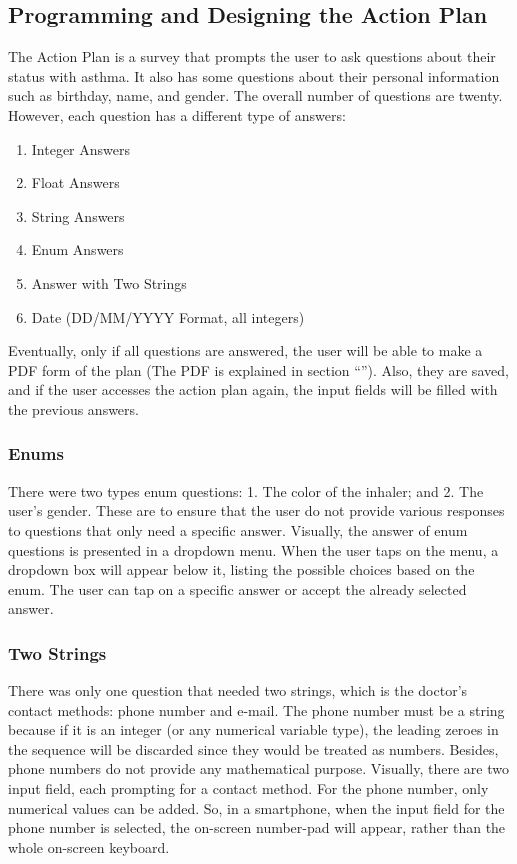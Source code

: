 \subsection{Programming and Designing the Action Plan}
The Action Plan is a survey that prompts the user to ask questions about their status with asthma. It also has some questions about their personal information such as birthday, name, and gender. The overall number of questions are twenty. However, each question has a different type of answers:
\begin{enumerate}
    \item{Integer Answers}
    
    \item{Float Answers}
    
    \item{String Answers}
    
    \item{Enum Answers}
    
    \item{Answer with Two Strings}
    
    \item{Date (DD/MM/YYYY Format, all integers)}
\end{enumerate}
Eventually, only if all questions are answered, the user will be able to make a PDF form of the plan (The PDF is explained in section “\textbf{}”). Also, they are saved, and if the user accesses the action plan again, the input fields will be filled with the previous answers.

\subsubsection*{Enums}
There were two types enum questions: 1. The color of the inhaler; and 2. The user’s gender. These are to ensure that the user do not provide various responses to questions that only need a specific answer. Visually, the answer of enum questions is presented in a dropdown menu. When the user taps on the menu, a dropdown box will appear below it, listing the possible choices based on the enum. The user can tap on a specific answer or accept the already selected answer.

\subsubsection*{Two Strings}
There was only one question that needed two strings, which is the doctor’s contact methods: phone number and e-mail. The phone number must be a string because if it is an integer (or any numerical variable type), the leading zeroes in the sequence will be discarded since they would be treated as numbers. Besides, phone numbers do not provide any mathematical purpose. Visually, there are two input field, each prompting for a contact method. For the phone number, only numerical values can be added. So, in a smartphone, when the input field for the phone number is selected, the on-screen number-pad will appear, rather than the whole on-screen keyboard.

